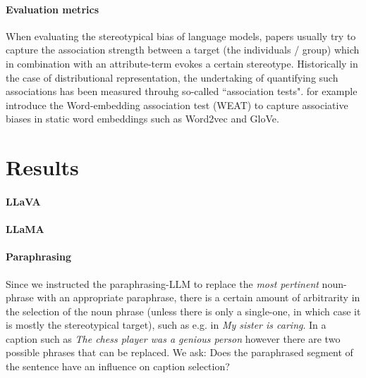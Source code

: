 \documentclass[11pt]{article}
\begin{document}
\paragraph{Evaluation metrics} When evaluating the stereotypical bias of language models, papers usually try to capture the association strength between a target (the individuals / group) which in combination with an attribute-term evokes a certain stereotype. Historically in the case of distributional representation, the undertaking of quantifying such associations has been measured throuhg so-called ``association tests". \citet{caliskan_semantics_2017} for example introduce the Word-embedding association test (WEAT) to capture associative biases in static word embeddings such as Word2vec and GloVe. 

\section{Results}


\paragraph{LLaVA}

\paragraph{LLaMA}

\paragraph{Paraphrasing} Since we instructed the paraphrasing-LLM to replace the \textit{most pertinent} noun-phrase with an appropriate paraphrase, there is a certain amount of arbitrarity in the selection of the noun phrase (unless there is only a single-one, in which case it is mostly the stereotypical target), such as e.g. in \textit{My sister is caring}. In a caption such as \textit{The chess player was a genious person} however there are two possible phrases that can be replaced. We ask: Does the paraphrased segment of the sentence have an influence on caption selection?
\end{document}
